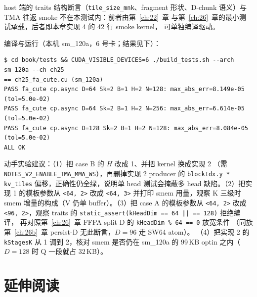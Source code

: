 host 端的 traits 结构断言（\texttt{tile\_\allowbreak{}size\_\allowbreak{}mnk}、fragment
形状、D-chunk 语义）与 TMA 往返 smoke 不在本测试内：前者由第~\ref{ch:22}~章
与第~\ref{ch:26}~章的最小测试承载，后者即本章实现 4 的 42 行 smoke kernel，
可单独编译驱动。

编译与运行（本机 sm\_120a，6 号卡；结果见下）：

{\footnotesize
\begin{lstlisting}[style=console]
$ cd book/tests && CUDA_VISIBLE_DEVICES=6 ./build_tests.sh --arch sm_120a --ch ch25
== ch25_fa_cute.cu (sm_120a)
PASS fa_cute cp.async D=64 Sk=2 B=1 H=2 N=128: max_abs_err=8.149e-05 (tol=5.0e-02)
PASS fa_cute cp.async D=64 Sk=2 B=1 H=2 N=256: max_abs_err=6.614e-05 (tol=5.0e-02)
PASS fa_cute cp.async D=128 Sk=2 B=1 H=2 N=128: max_abs_err=8.084e-05 (tol=5.0e-02)
ALL OK
\end{lstlisting}
}

动手实验建议：（1）把 case B 的 $H$ 改成 1、并把 kernel 换成实现 2
（需 \texttt{NOTES\_\allowbreak{}V2\_\allowbreak{}ENABLE\_\allowbreak{}TMA\_\allowbreak{}MMA\_\allowbreak{}WS}），再删掉实现 2 producer 的
\texttt{blockIdx.y * kv\_tiles} 偏移，正确性仍全绿，说明单 head
测试会掩蔽多 head 缺陷。（2）把实现 1 的模板参数从
\texttt{<64, 2>} 改成 \texttt{<64, 3>} 并打印 smem 用量，观察 K 三级时
smem 增量的构成（V 仍单 buffer）。（3）把 case A 的模板参数从
\texttt{<64, 2>} 改成 \texttt{<96, 2>}，观察 traits 的
\texttt{static\_\allowbreak{}assert\allowbreak{}(k\allowbreak{}Head\allowbreak{}Dim =\allowbreak{}=\allowbreak{} 64 || =\allowbreak{}=\allowbreak{} 128)} 拒绝编译，
再对照第~\ref{ch:26}~章 FFPA split-D 的 \texttt{kHeadDim \% 64 == 0} 放宽条件
（同族第~\ref{ch:26b}~章 persist-D 无此断言，$D{=}96$ 走 SW64 atom）。
（4）把实现 2 的 \texttt{kStagesK} 从 1 调到 2，核对 smem 是否仍在
sm\_120a 的 99\,KB optin 之内（$D{=}128$ 时 Q 一段就占 32\,KB）。



\section*{延伸阅读}

